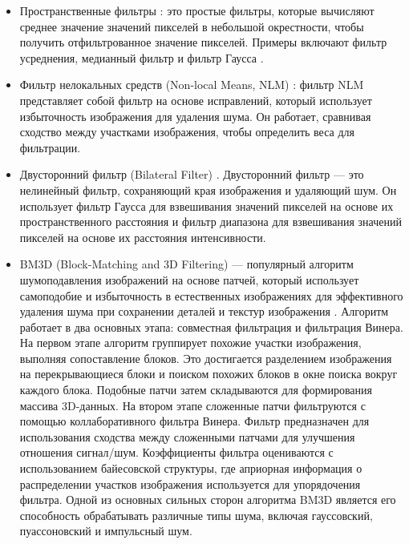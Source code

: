 \begin{itemize}
    \item Пространственные фильтры \cite{lib-spatial-filters}: это простые фильтры, которые вычисляют среднее значение значений пикселей в небольшой окрестности, чтобы получить отфильтрованное значение пикселей. Примеры включают фильтр усреднения, медианный фильтр и фильтр Гаусса \cite{lib-gaussian-filter}.

    \item Фильтр нелокальных средств (Non-local Means, NLM) \cite{lib-nlm}: фильтр NLM представляет собой фильтр на основе исправлений, который использует избыточность изображения для удаления шума. Он работает, сравнивая сходство между участками изображения, чтобы определить веса для фильтрации.

    \item Двусторонний фильтр (Bilateral Filter) \cite{lib-bilateral}. Двусторонний фильтр — это нелинейный фильтр, сохраняющий края изображения и удаляющий шум. Он использует фильтр Гаусса для взвешивания значений пикселей на основе их пространственного расстояния и фильтр диапазона для взвешивания значений пикселей на основе их расстояния интенсивности.
    \item BM3D (Block-Matching and 3D Filtering) — популярный алгоритм шумоподавления изображений на основе патчей, который использует самоподобие и избыточность в естественных изображениях для эффективного удаления шума при сохранении деталей и текстур изображения \cite{lib-bm3d}. Алгоритм работает в два основных этапа: совместная фильтрация и фильтрация Винера. На первом этапе алгоритм группирует похожие участки изображения, выполняя сопоставление блоков. Это достигается разделением изображения на перекрывающиеся блоки и поиском похожих блоков в окне поиска вокруг каждого блока. Подобные патчи затем складываются для формирования массива 3D-данных. На втором этапе сложенные патчи фильтруются с помощью коллаборативного фильтра Винера. Фильтр предназначен для использования сходства между сложенными патчами для улучшения отношения сигнал/шум. Коэффициенты фильтра оцениваются с использованием байесовской структуры, где априорная информация о распределении участков изображения используется для упорядочения фильтра. Одной из основных сильных сторон алгоритма BM3D является его способность обрабатывать различные типы шума, включая гауссовский, пуассоновский и импульсный шум. 
\end{itemize}
